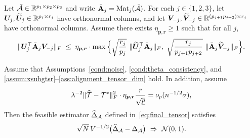 \documentclass[authoryear,preprint,review,12pt]{elsarticle}
\begin{document}
	\begin{assumption}
		\label{ass:alignment_tensor_dim}
		Let $\bar{\mathcal{A}}\in\mathbb{R}^{p_1\times p_2\times p_3}$ and write $\bar{\mathbf{A}}_j=\mathrm{Mat}_j(\bar{\mathcal{A}})$.
		For each $j\in\{1,2,3\}$, let $\boldsymbol U_j,\widetilde{\boldsymbol U}_j\in\mathbb{R}^{p_j\times r_j}$ have orthonormal columns, and let
		$\boldsymbol V_{-j},\widetilde{\boldsymbol V}_{-j}\in\mathbb{R}^{(p_{j+1}p_{j+2})\times r_j}$ have orthonormal columns.
		Assume there exists $\eta_{\bm p,\bm r}\ge 1$ such that for all $j$,
		\[
		\|\bU_j^\top \bar{\bA}_j \bV_{-j}\|_F
		\;\le\;
		\eta_{\bm p,\bm r}\cdot
		\max\Big\{
		\sqrt{\frac{r_j}{p_j}}\ \|\widetilde{\bU}_j^\top \bar{\bA}_j\|_F,\ 
		\sqrt{\frac{r_j}{p_{j+1}p_{j+2}}}\ \|\bar{\bA}_j \widetilde{\bV}_{-j}\|_F
		\Big\}.
		\]
	\end{assumption}
	  
	
	
	
	
	\begin{cor}\label{cor:tensor}
		Assume that Assumptions~\ref{cond:noise}, \ref{cond:theta_consistency}, and
		\ref{assum:xsubgtsr}--\ref{ass:alignment_tensor_dim} hold.
		In addition, assume 
		\[
		\lambda^{-2}\|\widehat{\mathcal{T}}-\mathcal{T}^\ast\|_F^2\cdot\eta_{\bm p,\bm r} \frac{\bar r}{\sqrt{\underline p}}
		=
		o_p(n^{-1/2}\sigma),
		\]
		Then the feasible estimator $\widehat{\Delta}_{\mathcal{A}}$ defined in~\eqref{eq:final_tensor} satisfies
		\[
		\sqrt{N}\,V^{-1/2}\bigl(\widehat{\Delta}_{\mathcal{A}}-\Delta_{\mathcal{A}}\bigr)
		\ \Rightarrow\ \mathcal{N}(0,1).
		\]
	\end{cor}
	
\end{document}
